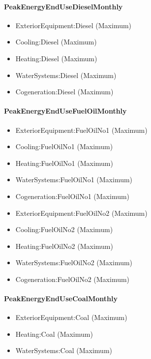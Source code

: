 \paragraph{PeakEnergyEndUseDieselMonthly}\label{peakenergyendusedieselmonthly}

\begin{itemize}
\item
  ExteriorEquipment:Diesel (Maximum)
\item
  Cooling:Diesel (Maximum)
\item
  Heating:Diesel (Maximum)
\item
  WaterSystems:Diesel (Maximum)
\item
  Cogeneration:Diesel (Maximum)
\end{itemize}

\paragraph{PeakEnergyEndUseFuelOilMonthly}\label{peakenergyendusefueloilmonthly}

\begin{itemize}
\item
  ExteriorEquipment:FuelOilNo1 (Maximum)
\item
  Cooling:FuelOilNo1 (Maximum)
\item
  Heating:FuelOilNo1 (Maximum)
\item
  WaterSystems:FuelOilNo1 (Maximum)
\item
  Cogeneration:FuelOilNo1 (Maximum)
\item
  ExteriorEquipment:FuelOilNo2 (Maximum)
\item
  Cooling:FuelOilNo2 (Maximum)
\item
  Heating:FuelOilNo2 (Maximum)
\item
  WaterSystems:FuelOilNo2 (Maximum)
\item
  Cogeneration:FuelOilNo2 (Maximum)
\end{itemize}

\paragraph{PeakEnergyEndUseCoalMonthly}\label{peakenergyendusecoalmonthly}

\begin{itemize}
\item
  ExteriorEquipment:Coal (Maximum)
\item
  Heating:Coal (Maximum)
\item
  WaterSystems:Coal (Maximum)
\end{itemize}


